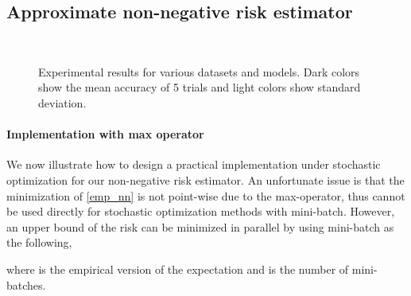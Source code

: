 \documentclass{article}
\begin{document}
\subsection{Approximate non-negative risk estimator}
\label{sc:implementation}
\begin{figure*}[t]
\vspace{-5mm}
\centering
{}
\hspace{0.001\textwidth}
\hspace{0.001\textwidth}
\hspace{0.001\textwidth}
\\
\vspace{-3mm}
\hspace{0.001\textwidth}
\hspace{0.001\textwidth}
\hspace{0.001\textwidth}
\caption{Experimental results for various datasets and models.  Dark colors show the mean accuracy of 5 trials and light colors show standard deviation.}\label{fig:results}
\end{figure*}
\paragraph{Implementation with max operator}
We now illustrate how to design a practical implementation under stochastic optimization for our non-negative risk estimator.
An unfortunate issue is that the minimization of \eqref{emp_nn} is not point-wise due to the max-operator, thus cannot be used directly for stochastic optimization methods with mini-batch.  However, an upper bound of the risk can be minimized in parallel by using mini-batch as the following,

where  is the empirical version of the expectation and  is the number of mini-batches.
\end{document}
